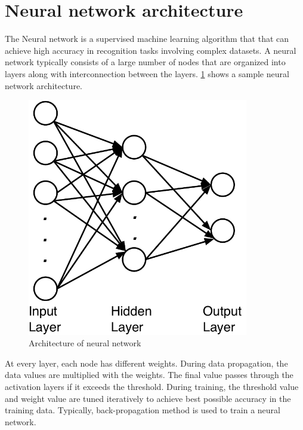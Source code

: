 \section{Neural network architecture}
The Neural network is a supervised machine learning algorithm that that can achieve high accuracy in recognition tasks involving complex datasets. 
A neural network typically consists of a large number of nodes that are organized into layers along with interconnection between the layers. 
\ref{f:nn_archi} shows a sample neural network architecture.

\begin{figure}[h]
\centering
\includegraphics[width=3.8in]{figures/nn.pdf}
\caption{Architecture of neural network}
\label{f:nn_archi}
\end{figure}

At every layer, each node has different weights.
During data propagation, the data values are multiplied with the weights.
The final value passes through the activation layers if it exceeds the threshold.
During training, the threshold value and weight value are tuned iteratively to achieve best possible accuracy in the training data. 
Typically, back-propagation method is used to train a neural network.











